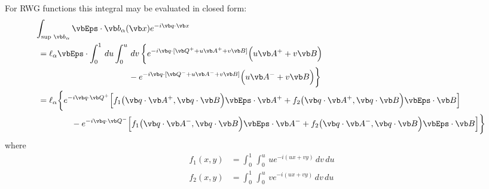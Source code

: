 \documentclass[letterpaper]{article}
\begin{document}
For RWG functions this integral may be evaluated in closed form:
\begin{align*}
&\!\!
\int_{\text{sup } \vb b_\alpha}
  \vbEps \cdot \vb b_\alpha(\vb x)e^{-i\vb q \cdot \vb x}
\\
&=\ell_\alpha\vbEps \cdot 
  \int_0^1 \, du \int_0^u \, dv \,
  \bigg\{
  e^{-i\vb q\cdot [\vb Q^+ + u \vb A^+ + v\vb B]}
  \Big(u\vb A^+ + v\vb B\Big)
\\ 
  &\hspace{1.5in}
  - 
  e^{-i\vb q\cdot [\vb Q^- + u \vb A^- + v\vb B]}
  \Big(u\vb A^- + v\vb B\Big)
  \bigg\}
\\
&=\ell_\alpha\bigg\{ 
  e^{-i\vb q \cdot \vb Q^+} 
  \Big[ f_1\big(\vb q\cdot \vb A^+, \vb q\cdot \vb B\Big) 
           \vbEps \cdot \vb A^+
       +f_2\big(\vb q\cdot \vb A^+, \vb q\cdot \vb B\Big)
           \vbEps \cdot \vb B
  \Big]
\\
&\qquad\qquad
  -
  e^{-i\vb q \cdot \vb Q^-} 
  \Big[ f_1\big(\vb q\cdot \vb A^-, \vb q\cdot \vb B\Big)
           \vbEps \cdot \vb A^-
       +f_2\big(\vb q\cdot \vb A^-, \vb q\cdot \vb B\Big)
           \vbEps \cdot \vb B
  \Big]\bigg\}
\\
\end{align*}
where
\begin{align*}
 f_1(x, y)&=\int_0^1 \, \int_0^u \, u e^{-i (ux + vy)} \,dv\,du  
\\
 f_2(x, y)&=\int_0^1 \, \int_0^u \, v e^{-i (ux + vy)} \,dv\,du  
\end{align*}
\end{document}
